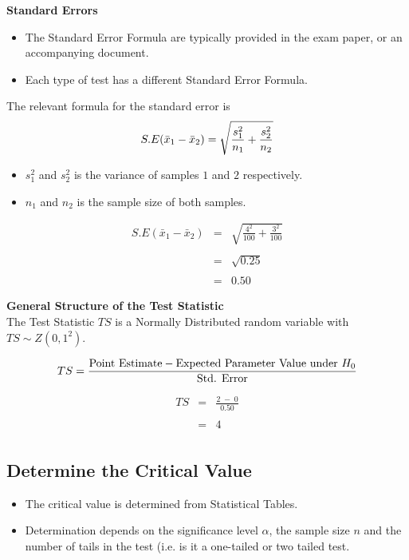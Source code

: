 \documentclass[a4paper,12pt]{article}
\begin{document}
\noindent \textbf{Standard Errors}
\begin{itemize}
    \item The Standard Error Formula are typically provided in the exam paper, or an accompanying document.
    \item Each type of test has a different Standard Error Formula.
\end{itemize}
\begin{framed}
 The relevant formula for the standard error is
\[ S.E(\bar{x}_1 - \bar{x}_2) = \sqrt{{s^2_1\over n_1}+{s^2_2 \over n_2}} \]
\end{framed}
\bigskip
\begin{itemize}
\item $s^2_1$ and $s^2_2$ is the variance of samples $1$ and $2$ respectively.
\item $n_1$ and $n_2$ is the sample size of both samples.\bigskip

\end{itemize}
\begin{eqnarray*}
 S.E(\bar{x}_1 - \bar{x}_2) &=& \sqrt{ \frac{4^2}{100} + \frac{3^2}{100} } \\
& & \\
&=& \sqrt{ 0.25  }\\
& & \\
&=& 0.50
\end{eqnarray*}
\newpage 

\noindent \textbf{General Structure of the Test Statistic}\\
\noindent The Test Statistic $TS$ is a Normally  Distributed random variable with $TS \sim Z(0,1^2)$.
\begin{framed}
\[ TS = {\mbox{Point Estimate} - \mbox{Expected Parameter Value under $H_{0}$} \over \mbox{Std. Error}}\]
\end{framed}


\begin{eqnarray*}
TS &=& \frac{ 2\;-\; 0}{0.50} \\
& & \\
&=& 4\\
\end{eqnarray*}
\newpage 
\subsection*{Determine the Critical Value}

\begin{itemize}
\item The critical value is determined from Statistical Tables.
\item Determination depends on the significance level $\alpha$, the sample size $n$ and the number of tails in the test (i.e. is it a one-tailed or two tailed test.
\end{itemize}
\end{document}
